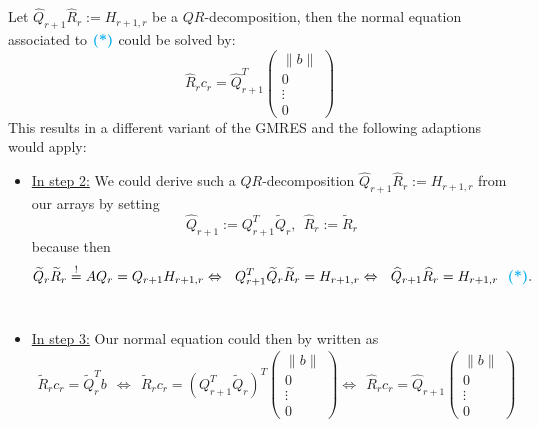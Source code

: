 \begin{frame}
Let $\widehat{Q}_{r+1}\widehat{R}_r:=H_{r+1,r}$ be a $QR$-decomposition, then the normal equation associated to $\textbf{\color{cyan}(*)}$ could be solved by:
$$
\widehat{R}_rc_r=\widehat{Q}_{r+1}^T\begin{pmatrix}
\|b\|\\0\\\vdots\\0
\end{pmatrix}
$$
This results in a different variant of the GMRES and the following adaptions would apply:
\begin{itemize}
	\item \underline{In step 2:} We could derive such a $QR$-decomposition $\widehat{Q}_{r+1}\widehat{R}_r:=H_{r+1,r}$ from our arrays by setting $$\widehat{Q}_{r+1}:=Q_{r+1}^T\widetilde{Q}_r,~~\widehat{R}_r:=\widetilde{R}_r $$ because then
	\begin{align*}
	\widetilde{Q}_r\widetilde{R}_r\stackrel{!}{=}AQ_r=Q_{r+1}H_{r+1,r}
	\Leftrightarrow~~Q_{r+1}^T\widetilde{Q}_r\widetilde{R}_r=H_{r+1,r}
	\Leftrightarrow~~\widehat{Q}_{r+1}\widehat{R}_r = H_{r+1,r} ~~\textbf{\color{cyan}(*)}.
	\end{align*}
	~\\
	\item \underline{In step 3:} Our normal equation could then by written as
	\begin{align*}
	\widetilde{R}_rc_r=\widetilde{Q}_r^Tb~~\Leftrightarrow~~\widetilde{R}_rc_r=(Q_{r+1}^T\widetilde{Q}_r)^T\begin{pmatrix}
	\|b\|\\0\\\vdots\\0
	\end{pmatrix}
	\Leftrightarrow~~\widehat{R}_rc_r=\widehat{Q}_{r+1}\begin{pmatrix}
	\|b\|\\0\\\vdots\\0
	\end{pmatrix}
	\end{align*}
\end{itemize}
\end{frame}
